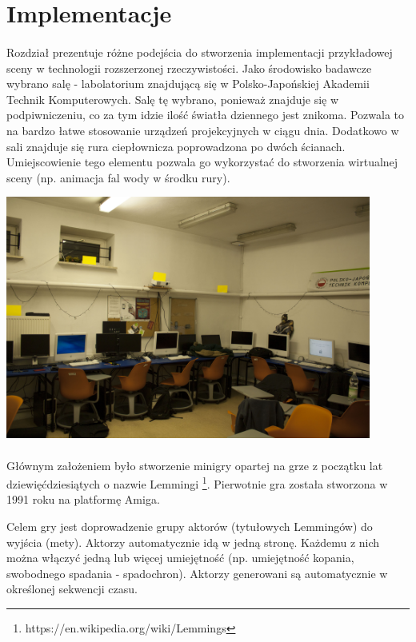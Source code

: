 \newpage
\section{Implementacje}
\paragraph{}
Rozdział prezentuje różne podejścia do stworzenia implementacji przykładowej sceny  w technologii rozszerzonej rzeczywistości.
Jako środowisko badawcze wybrano salę - labolatorium znajdującą się w Polsko-Japońskiej Akademii Technik Komputerowych. Salę tę wybrano, ponieważ znajduje się w podpiwniczeniu, co za tym idzie ilość światła dziennego jest znikoma. Pozwala to na bardzo łatwe stosowanie urządzeń projekcyjnych w ciągu dnia. Dodatkowo w sali znajduje się rura ciepłownicza poprowadzona po dwóch ścianach. Umiejscowienie tego elementu pozwala go wykorzystać do stworzenia wirtualnej sceny (np. animacja fal wody w środku rury).

\begin{center}
\includegraphics[width=0.9\textwidth]{images/s9.jpg}
\end{center}

\paragraph{}
Głównym założeniem było stworzenie minigry opartej na grze z początku lat dziewięćdziesiątych o nazwie Lemmingi \footnote{https://en.wikipedia.org/wiki/Lemmings}. Pierwotnie gra została stworzona w 1991 roku na platformę Amiga.

Celem gry jest doprowadzenie grupy aktorów (tytułowych Lemmingów) do wyjścia (mety). Aktorzy automatycznie idą w jedną stronę. Każdemu z nich można włączyć jedną lub więcej umiejętność (np. umiejętność kopania, swobodnego spadania - spadochron). Aktorzy generowani są automatycznie w określonej sekwencji czasu.

